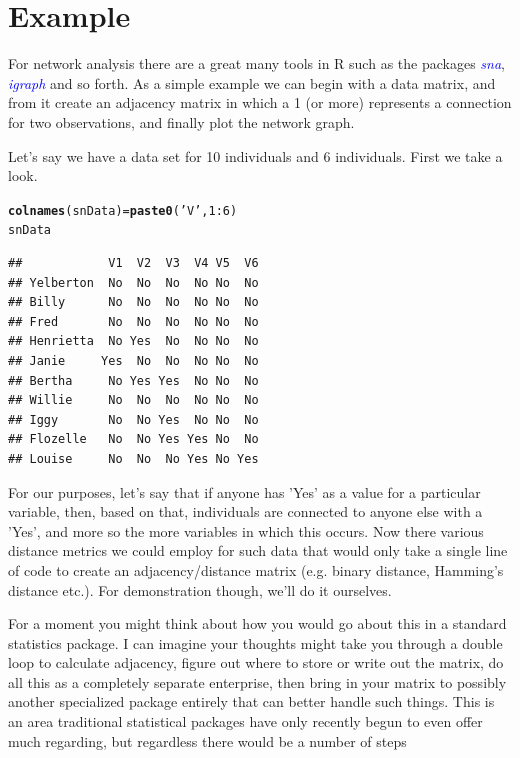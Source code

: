 \documentclass[english,nohyper,titlepage]{tufte-handout}\usepackage[]{graphicx}\usepackage[]{color}
\makeatletter
\newcommand{\hlnum}[1]{\textcolor[rgb]{0.686,0.059,0.569}{#1}}%
\newcommand{\hlstr}[1]{\textcolor[rgb]{0.192,0.494,0.8}{#1}}%
\newcommand{\hlopt}[1]{\textcolor[rgb]{0,0,0}{#1}}%
\newcommand{\hlstd}[1]{\textcolor[rgb]{0.345,0.345,0.345}{#1}}%
\newcommand{\hlkwb}[1]{\textcolor[rgb]{0.69,0.353,0.396}{#1}}%
\newcommand{\hlkwd}[1]{\textcolor[rgb]{0.737,0.353,0.396}{\textbf{#1}}}%
\newenvironment{kframe}{%
 \def\at@end@of@kframe{}%
 \ifinner\ifhmode%
  \def\at@end@of@kframe{\end{minipage}}%
  \begin{minipage}{\columnwidth}%
 \fi\fi%
 \def\FrameCommand##1{\hskip\@totalleftmargin \hskip-\fboxsep
 \colorbox{shadecolor}{##1}\hskip-\fboxsep
     \hskip-\linewidth \hskip-\@totalleftmargin \hskip\columnwidth}%
 \MakeFramed {\advance\hsize-\width
   \@totalleftmargin\z@ \linewidth\hsize
   \@setminipage}}%
 {\par\unskip\endMakeFramed%
 \at@end@of@kframe}
\newenvironment{knitrout}{}{} %
\makeatother
\begin{document}
\section{Example}
For network analysis there are a great many tools in R such as the packages \emph{\textcolor{blue}{sna}}, \emph{\textcolor{blue}{igraph}} and so forth.  As a simple example we can begin with a data matrix, and from it create an adjacency matrix in which a 1 (or more) represents a connection for two observations, and finally plot the network graph.

Let's say we have a data set for 10 individuals and 6 individuals.  First we take a look.

\begin{knitrout}\footnotesize
{}\color{fgcolor}\begin{kframe}
\begin{alltt}
\hlkwd{colnames}\hlstd{(snData)} \hlkwb{=} \hlkwd{paste0}\hlstd{(}\hlstr{'V'}\hlstd{,}\hlnum{1}\hlopt{:}\hlnum{6}\hlstd{)}
\hlstd{snData}
\end{alltt}
\begin{verbatim}
##            V1  V2  V3  V4 V5  V6
## Yelberton  No  No  No  No No  No
## Billy      No  No  No  No No  No
## Fred       No  No  No  No No  No
## Henrietta  No Yes  No  No No  No
## Janie     Yes  No  No  No No  No
## Bertha     No Yes Yes  No No  No
## Willie     No  No  No  No No  No
## Iggy       No  No Yes  No No  No
## Flozelle   No  No Yes Yes No  No
## Louise     No  No  No Yes No Yes
\end{verbatim}
\end{kframe}
\end{knitrout}

For our purposes, let's say that if anyone has 'Yes' as a value for a particular variable, then, based on that, individuals are connected to anyone else with a 'Yes', and more so the more variables in which this occurs. Now there various distance metrics we could employ for such data that would only take a single line of code to create an adjacency/distance matrix (e.g. binary distance, Hamming's distance etc.).  For demonstration though, we'll do it ourselves.  

For a moment you might think about how you would go about this in a standard statistics package.  I can imagine your thoughts might take you through a double loop to calculate adjacency, figure out where to store or write out the matrix, do all this as a completely separate enterprise, then bring in your matrix to possibly another specialized package entirely that can better handle such things.  This is an area traditional statistical packages have only recently begun to even offer much regarding, but regardless there would be a number of steps
\end{document}
